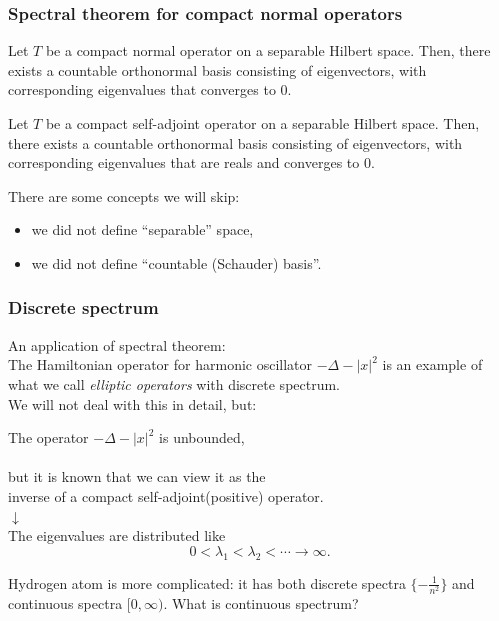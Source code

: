 \documentclass[10pt,handout]{beamer}
\begin{document}
\begin{frame}
\frametitle{Spectral theorem for compact normal operators}
  \begin{thm}
    Let $T$ be a compact normal operator on a separable Hilbert space. Then, there exists a countable orthonormal basis consisting of eigenvectors, with corresponding eigenvalues that converges to 0.
  \end{thm}
  \begin{thm}
    Let $T$ be a compact self-adjoint operator on a separable Hilbert space. Then, there exists a countable orthonormal basis consisting of eigenvectors, with corresponding eigenvalues that are reals and converges to 0.
  \end{thm}
  \pause
  \begin{rmk}
    There are some concepts we will skip:
    \begin{itemize}
      \item we did not define ``separable'' space,
      \item we did not define ``countable (Schauder) basis''.
    \end{itemize}
  \end{rmk}
\end{frame}

\begin{frame}
\frametitle{Discrete spectrum}
  An application of spectral theorem:\\
  The Hamiltonian operator for harmonic oscillator $-\Delta-|x|^2$ is an example of what we call \emph{elliptic operators} with discrete spectrum.\\
  We will not deal with this in detail, but:
  \bigskip
  \begin{center}
    \pause The operator $-\Delta-|x|^2$ is unbounded,\\$\ $\\
    \pause but it is known that we can view it as the\\
    inverse of a compact self-adjoint(positive) operator.\\
    \pause $\downarrow$ \\
    The eigenvalues are distributed like
    \[0<\lambda_1<\lambda_2<\cdots\to\infty.\]
  \end{center}
  \pause Hydrogen atom is more complicated: it has both discrete spectra $\{-\frac1{n^2}\}$ and continuous spectra $[0,\infty)$.
  What is continuous spectrum?
\end{frame}
\end{document}
